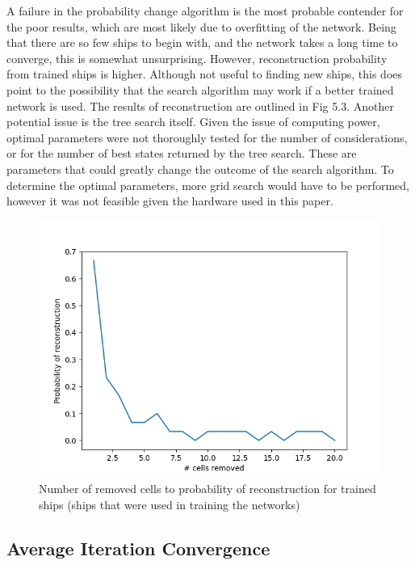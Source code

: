 \documentclass{l4proj}
\begin{document}
A failure in the probability change algorithm is the most probable contender for the poor results, which are most likely due to overfitting of the network. Being that there are so few ships to begin with, and the network takes a long time to converge, this is somewhat unsurprising. However, reconstruction probability from trained ships is higher. Although not useful to finding new ships, this does point to the possibility that the search algorithm may work if a better trained network is used. The results of reconstruction are outlined in Fig 5.3. Another potential issue is the tree search itself. Given the issue of computing power, optimal parameters were not thoroughly tested for the number of considerations, or for the number of best states returned by the tree search. These are parameters that could greatly change the outcome of the search algorithm. To determine the optimal parameters, more grid search would have to be performed, however it was not feasible given the hardware used in this paper. 


\begin{figure}[h!]
\centering
\includegraphics[width=0.8\linewidth]{dissertation/images/graphs/probability_of_reconstruction_against_damage_trained.png}
\caption{Number of removed cells to probability of reconstruction for trained ships (ships that were used in training the networks)}
\label{fig:subim1}
\end{figure}


\subsection{Average Iteration Convergence}
\end{document}
